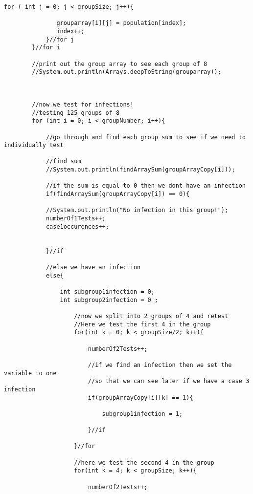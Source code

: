 \documentclass[letterpaper, 10pt,DIV=13]{scrartcl}
\numberwithin{equation}{section} %
\numberwithin{figure}{section} %
\numberwithin{table}{section} %
\begin{document}
\begin{lstlisting}[frame=single, ]
            for ( int j = 0; j < groupSize; j++){

               grouparray[i][j] = population[index];
               index++;
            }//for j
        }//for i

        //print out the group array to see each group of 8
        //System.out.println(Arrays.deepToString(grouparray));
                

        
        //now we test for infections!
        //testing 125 groups of 8
        for (int i = 0; i < groupNumber; i++){
            
            //go through and find each group sum to see if we need to individually test

            //find sum
            //System.out.println(findArraySum(groupArrayCopy[i]));

            //if the sum is equal to 0 then we dont have an infection
            if(findArraySum(groupArrayCopy[i]) == 0){
                    
            //System.out.println("No infection in this group!");
            numberOf1Tests++;
            case1occurences++;
                
                
            }//if  

            //else we have an infection
            else{

                int subgroup1infection = 0;
                int subgroup2infection = 0 ;

                    //now we split into 2 groups of 4 and retest
                    //Here we test the first 4 in the group
                    for(int k = 0; k < groupSize/2; k++){

                        numberOf2Tests++;

                        //if we find an infection then we set the variable to one
                        //so that we can see later if we have a case 3 infection
                        if(groupArrayCopy[i][k] == 1){
                           
                            subgroup1infection = 1;

                        }//if
    
                    }//for

                    //here we test the second 4 in the group
                    for(int k = 4; k < groupSize; k++){

                        numberOf2Tests++;
                        

\end{lstlisting}
\end{document}
